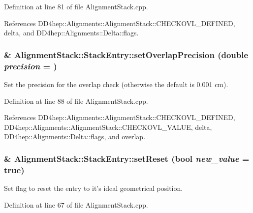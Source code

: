 Definition at line 81 of file AlignmentStack.cpp.

References DD4hep::Alignments::AlignmentStack::CHECKOVL\_\-DEFINED, delta, and DD4hep::Alignments::Delta::flags.\hypertarget{struct_d_d4hep_1_1_alignments_1_1_alignment_stack_1_1_stack_entry_a0b82028a7597f34015a833c6273bd36b}{
\subsubsection[{setOverlapPrecision}]{ \& AlignmentStack::StackEntry::setOverlapPrecision (double {\em precision} = {})}}
\label{struct_d_d4hep_1_1_alignments_1_1_alignment_stack_1_1_stack_entry_a0b82028a7597f34015a833c6273bd36b}


Set the precision for the overlap check (otherwise the default is 0.001 cm). 

Definition at line 88 of file AlignmentStack.cpp.

References DD4hep::Alignments::AlignmentStack::CHECKOVL\_\-DEFINED, DD4hep::Alignments::AlignmentStack::CHECKOVL\_\-VALUE, delta, DD4hep::Alignments::Delta::flags, and overlap.\hypertarget{struct_d_d4hep_1_1_alignments_1_1_alignment_stack_1_1_stack_entry_acd99f7e6583a0c0b65dff2393eaa670c}{
\subsubsection[{setReset}]{ \& AlignmentStack::StackEntry::setReset (bool {\em new\_\-value} = {\ttfamily true})}}
\label{struct_d_d4hep_1_1_alignments_1_1_alignment_stack_1_1_stack_entry_acd99f7e6583a0c0b65dff2393eaa670c}


Set flag to reset the entry to it's ideal geometrical position. 

Definition at line 67 of file AlignmentStack.cpp.

